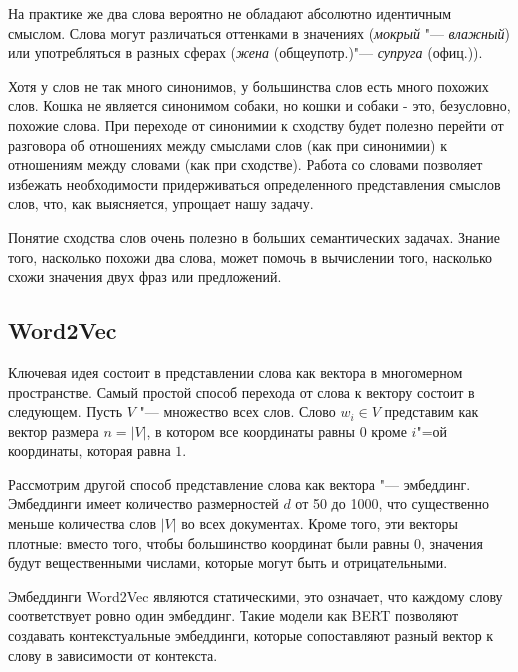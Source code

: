 \documentclass[coursework]{SCWorks}
\begin{document}
На практике же два слова вероятно не обладают абсолютно идентичным смыслом. Слова могут различаться оттенками в значениях (\textit{мокрый} "--- \textit{влажный}) или употребляться в разных сферах (\textit{жена} (общеупотр.)"--- \textit{супруга} (офиц.)).

Хотя у слов не так много синонимов, у большинства слов есть много похожих слов. Кошка не является синонимом собаки, но кошки и собаки - это, безусловно, похожие слова. При переходе от синонимии к сходству будет полезно перейти от разговора об отношениях между смыслами слов (как при синонимии) к отношениям между словами (как при сходстве). Работа со словами позволяет избежать необходимости придерживаться определенного представления смыслов слов, что, как выясняется, упрощает нашу задачу. 

Понятие сходства слов очень полезно в больших семантических задачах. Знание того, насколько похожи два слова, может помочь в вычислении того, насколько схожи значения двух фраз или предложений.

\subsection{Word2Vec}
Ключевая идея состоит в представлении слова как вектора в многомерном пространстве. Самый простой способ перехода от слова к вектору состоит в следующем. Пусть $V$ "--- множество всех слов. Слово $w_i \in V$ представим как вектор размера $n = |V|$, в котором все координаты равны $0$ кроме $i$"=ой координаты, которая равна $1$.

Рассмотрим другой способ представление слова как вектора "--- эмбеддинг. Эмбеддинги имеет количество размерностей $d$ от 50 до 1000, что существенно меньше количества слов $|V|$ во всех документах. Кроме того, эти векторы плотные: вместо того, чтобы большинство координат были равны 0, значения будут вещественными числами, которые могут быть и отрицательными.

Эмбеддинги Word2Vec являются статическими, это означает, что каждому слову соответствует ровно один эмбеддинг. Такие модели как BERT позволяют создавать контекстуальные эмбеддинги, которые сопоставляют разный вектор к слову в зависимости от контекста.
\end{document}
